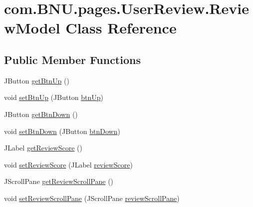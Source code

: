 \hypertarget{classcom_1_1_b_n_u_1_1pages_1_1_user_review_1_1_review_model}{}\section{com.\+B\+N\+U.\+pages.\+User\+Review.\+Review\+Model Class Reference}
\label{classcom_1_1_b_n_u_1_1pages_1_1_user_review_1_1_review_model}
\subsection*{Public Member Functions}
\begin{DoxyCompactItemize}
\item 
J\+Button \mbox{\hyperlink{classcom_1_1_b_n_u_1_1pages_1_1_user_review_1_1_review_model_ac2065077fcca2e372405714895039a90}{get\+Btn\+Up}} ()
\item 
void \mbox{\hyperlink{classcom_1_1_b_n_u_1_1pages_1_1_user_review_1_1_review_model_aece61a0ae3720f9fcbd2731e3713a076}{set\+Btn\+Up}} (J\+Button \mbox{\hyperlink{classcom_1_1_b_n_u_1_1pages_1_1_user_review_1_1_review_model_abf126b7551091cfb8cffe206306c6e39}{btn\+Up}})
\item 
J\+Button \mbox{\hyperlink{classcom_1_1_b_n_u_1_1pages_1_1_user_review_1_1_review_model_a03649ee6314cd9be7fd7835d49cf09b7}{get\+Btn\+Down}} ()
\item 
void \mbox{\hyperlink{classcom_1_1_b_n_u_1_1pages_1_1_user_review_1_1_review_model_a0514d7fee82d7bed661d1802243e335b}{set\+Btn\+Down}} (J\+Button \mbox{\hyperlink{classcom_1_1_b_n_u_1_1pages_1_1_user_review_1_1_review_model_a2c897b4590afad98f764f25ae79a7af6}{btn\+Down}})
\item 
J\+Label \mbox{\hyperlink{classcom_1_1_b_n_u_1_1pages_1_1_user_review_1_1_review_model_a207f9609cf90d3e692d0cb47e4984cd7}{get\+Review\+Score}} ()
\item 
void \mbox{\hyperlink{classcom_1_1_b_n_u_1_1pages_1_1_user_review_1_1_review_model_a51b937ee829978e17d72c5cdb1456bd8}{set\+Review\+Score}} (J\+Label \mbox{\hyperlink{classcom_1_1_b_n_u_1_1pages_1_1_user_review_1_1_review_model_a1296056509c9ab87c7d8945e33de8550}{review\+Score}})
\item 
J\+Scroll\+Pane \mbox{\hyperlink{classcom_1_1_b_n_u_1_1pages_1_1_user_review_1_1_review_model_a4406c7eb3cb98678265ab239ac542e83}{get\+Review\+Scroll\+Pane}} ()
\item 
void \mbox{\hyperlink{classcom_1_1_b_n_u_1_1pages_1_1_user_review_1_1_review_model_a2809a9723f0c2200c707eda769f774ab}{set\+Review\+Scroll\+Pane}} (J\+Scroll\+Pane \mbox{\hyperlink{classcom_1_1_b_n_u_1_1pages_1_1_user_review_1_1_review_model_a0a6a537d6c98f2eb84747a7830a2a848}{review\+Scroll\+Pane}})

\end{DoxyCompactItemize}
